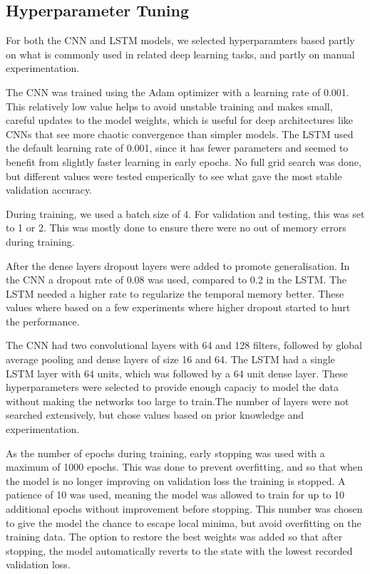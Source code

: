 \documentclass[conference]{IEEEtran}
\begin{document}
 \subsection{Hyperparameter Tuning}
 For both the CNN and LSTM models, we selected hyperparamters based partly on what is commonly used in related deep learning tasks, and partly on manual experimentation.
 
 The CNN was trained using the Adam optimizer with a learning rate of 0.001. This relatively low value helps to avoid unstable training and makes small, careful updates to the model weights, which is useful for deep architectures like CNNs that see more chaotic convergence than simpler models. The LSTM used the default learning rate of 0.001, since it has fewer parameters and seemed to benefit from slightly faster learning in early epochs. No full grid search was done, but different values were tested emperically to see what gave the most stable validation accuracy.
 
 During training, we used a batch size of 4. For validation and testing, this was set to 1 or 2. This was mostly done to ensure there were no out of memory errors during training.
 
 After the dense layers dropout layers were added to promote generalisation. In the CNN a dropout rate of 0.08 was used, compared to 0.2 in the LSTM. The LSTM needed a higher rate to regularize the temporal memory better. These values where based on a few experiments where higher dropout started to hurt the performance. 
 
 The CNN had two convolutional layers with 64 and 128 filters, followed by global average pooling and dense layers of size 16 and 64. The LSTM had a single LSTM layer with 64 units, which was followed by a 64 unit dense layer. These hyperparameters were selected to provide enough capaciy to model the data without making the networks too large to train.The number of layers were not searched extensively, but chose values based on prior knowledge and experimentation.
 
 As the number of epochs during training, early stopping was used with a maximum of 1000 epochs. This was done to prevent overfitting, and so that when the model is no longer improving on validation loss the training is stopped. A patience of 10 was used, meaning the model was allowed to train for up to 10 additional epochs without improvement before stopping. This number was chosen to give the model the chance to escape local minima, but avoid overfitting on the training data. The option to restore the best weights was added so that after stopping, the model automatically reverts to the state with the lowest recorded validation loss.
 
\end{document}
